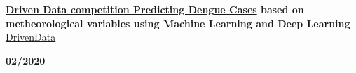 \begin{minipage}{0.8\textwidth}
    \parbox{0.8\linewidth}{\textbf{\hyperref[sec:dengue]{Driven Data competition Predicting Dengue Cases} based on metheorological variables using Machine Learning and Deep Learning} \href{https://www.drivendata.org/competitions/44/dengai-predicting-disease-spread}{DrivenData}} \hfill \textbf{02/2020}\\
    \\
\end{minipage} \hfill {}\\
